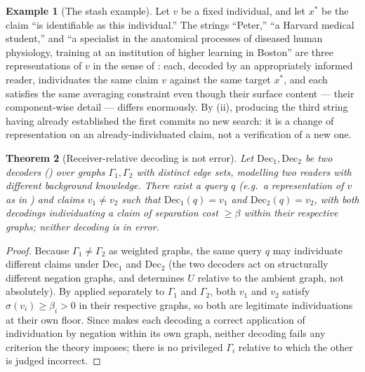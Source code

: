\documentclass[11pt,twocolumn,a4paper]{article}
\theoremstyle{thmstyle}
\newtheorem{theorem}{Theorem}[section]
\theoremstyle{definition}
\newtheorem{example}[theorem]{Example}
\theoremstyle{remark}
\newcommand{\Gph}{\Gamma}
\newcommand{\flo}{\beta}
\newcommand{\str}{\sigma}
\begin{document}
\begin{example}[The stash example]
\label{ex:stash}
Let $v$ be a fixed individual, and let $x^{\ast}$ be the claim ``is
identifiable as this individual.'' The strings ``Peter,'' ``a Harvard
medical student,'' and ``a specialist in the anatomical processes of
diseased human physiology, training at an institution of higher learning
in Boston'' are three representations of $v$ in the sense of
: each, decoded by an appropriately informed
reader, individuates the same claim $v$ against the same target
$x^{\ast}$, and each satisfies the same averaging constraint even though
their surface content --- their component-wise detail --- differs
enormously. By (ii), producing the third string
having already established the first commits no new search: it is a
change of representation on an already-individuated claim, not a
verification of a new one.
\end{example}

\begin{theorem}[Receiver-relative decoding is not error]
\label{thm:receiver-relative}
Let $\mathrm{Dec}_1,\mathrm{Dec}_2$ be two decoders ()
over graphs $\Gph_1,\Gph_2$ with distinct edge sets, modelling two readers
with different background knowledge. There exist a query $q$ (e.g.\ a
representation of $v$ as in ) and claims $v_1\neq v_2$ such
that $\mathrm{Dec}_1(q)=v_1$ and $\mathrm{Dec}_2(q)=v_2$, with both
decodings individuating a claim of separation cost $\ge\flo$ within their
respective graphs; neither decoding is in error.
\end{theorem}

\begin{proof}
Because $\Gph_1\neq\Gph_2$ as weighted graphs, the same query $q$ may
individuate different claims under $\mathrm{Dec}_1$ and $\mathrm{Dec}_2$
(the two decoders act on structurally different negation graphs, and
 determines $U$ relative to the ambient graph, not
absolutely). By  applied separately to $\Gph_1$ and
$\Gph_2$, both $v_1$ and $v_2$ satisfy $\str(v_i)\ge\flo_i>0$ in their
respective graphs, so both are legitimate individuations at their own
floor. Since  makes each decoding a correct
application of individuation by negation within its own graph, neither
decoding fails any criterion the theory imposes; there is no privileged
$\Gph_i$ relative to which the other is judged incorrect.
\end{proof}
\end{document}
